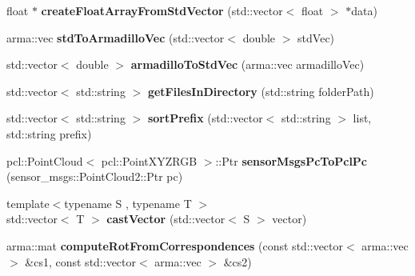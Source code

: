 \begin{DoxyCompactItemize}
\item 
float $\ast$ {\bfseries create\+Float\+Array\+From\+Std\+Vector} (std\+::vector$<$ float $>$ $\ast$data)\hypertarget{namespacekukadu_a8e1c0f80941da1d7aa88815fc93d7c7e}{}\label{namespacekukadu_a8e1c0f80941da1d7aa88815fc93d7c7e}

\item 
arma\+::vec {\bfseries std\+To\+Armadillo\+Vec} (std\+::vector$<$ double $>$ std\+Vec)\hypertarget{namespacekukadu_a62ccc34ae961950c370f6b4eb79eb43d}{}\label{namespacekukadu_a62ccc34ae961950c370f6b4eb79eb43d}

\item 
std\+::vector$<$ double $>$ {\bfseries armadillo\+To\+Std\+Vec} (arma\+::vec armadillo\+Vec)\hypertarget{namespacekukadu_a045fd840a5811c4c12be38c5d44bdfaf}{}\label{namespacekukadu_a045fd840a5811c4c12be38c5d44bdfaf}

\item 
std\+::vector$<$ std\+::string $>$ {\bfseries get\+Files\+In\+Directory} (std\+::string folder\+Path)\hypertarget{namespacekukadu_a697f64d963479c2d3ba5c2a2a0cd510f}{}\label{namespacekukadu_a697f64d963479c2d3ba5c2a2a0cd510f}

\item 
std\+::vector$<$ std\+::string $>$ {\bfseries sort\+Prefix} (std\+::vector$<$ std\+::string $>$ list, std\+::string prefix)\hypertarget{namespacekukadu_a6240d6b07b740be2461ce1e8b93b5f33}{}\label{namespacekukadu_a6240d6b07b740be2461ce1e8b93b5f33}

\item 
pcl\+::\+Point\+Cloud$<$ pcl\+::\+Point\+X\+Y\+Z\+R\+GB $>$\+::Ptr {\bfseries sensor\+Msgs\+Pc\+To\+Pcl\+Pc} (sensor\+\_\+msgs\+::\+Point\+Cloud2\+::\+Ptr pc)\hypertarget{namespacekukadu_a09e1a8e2f66ed4175cfded7f9de11554}{}\label{namespacekukadu_a09e1a8e2f66ed4175cfded7f9de11554}

\item 
{\footnotesize template$<$typename S , typename T $>$ }\\std\+::vector$<$ T $>$ {\bfseries cast\+Vector} (std\+::vector$<$ S $>$ vector)\hypertarget{namespacekukadu_a71a1f703954d18a1e978d462558a249f}{}\label{namespacekukadu_a71a1f703954d18a1e978d462558a249f}

\item 
arma\+::mat {\bfseries compute\+Rot\+From\+Correspondences} (const std\+::vector$<$ arma\+::vec $>$ \&cs1, const std\+::vector$<$ arma\+::vec $>$ \&cs2)\hypertarget{namespacekukadu_a2e805847e0310f544432e1fca18123a6}{}\label{namespacekukadu_a2e805847e0310f544432e1fca18123a6}


\end{DoxyCompactItemize}

